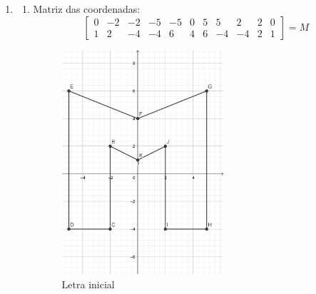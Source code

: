 \documentclass[english,ngerman,parskip=half]{scrartcl}
\begin{document}
\begin{enumerate}
    \item
        \begin{enumerate}
            \item[]
            Matriz das coordenadas:
            \begin{equation}
                \begin{bmatrix}
                0 & -2 & -2 & -5 & -5 & 0 & 5 & 5 & 2 & 2 & 0 \\
                1 & 2  & -4 & -4 & 6  & 4 & 6 & -4& -4& 2 & 1 
                \end{bmatrix}
                 = M
            \end{equation}
            \begin{figure}[ht!]
                \centering
                \includegraphics[width=60mm]{./images/ex3-letra-inicial.png}
                \caption{Letra inicial}
            \end{figure}
    

\end{enumerate}
\end{enumerate}
\end{document}
